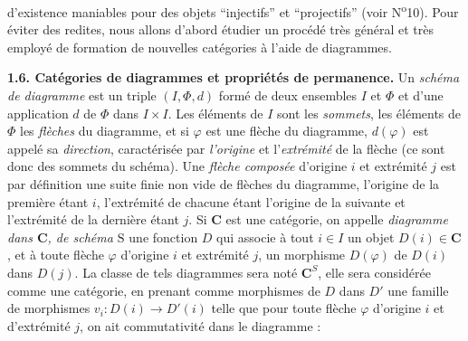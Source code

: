 
\noindent d'existence maniables pour des objets ``injectifs'' et
``projectifs'' (voir N\textsuperscript{o}10). Pour éviter des redites, nous
allons d'abord étudier un procédé très général et très employé de formation de
nouvelles catégories à l'aide de diagrammes.

\noindent\textbf{1.6. Catégories de diagrammes et propriétés de permanence.}
Un \textit{schéma de diagramme} est un triple $(I,\Phi,d)$ formé de deux
ensembles $I$ et $\Phi$ et d'une application $d$ de $\Phi$ dans $I\times I$.
Les éléments de $I$ sont les \textit{sommets}, les éléments de $\Phi$ les
\textit{flèches} du diagramme, et si $\varphi$ est une flèche du diagramme,
$d(\varphi)$ est appelé sa \textit{direction}, caractérisée par
\textit{l'origine} et l'\textit{extrémité} de la flèche (ce sont donc des
sommets du schéma).
Une \textit{flèche composée} d'origine $i$ et extrémité $j$ est par définition
une suite finie non vide de flèches du diagramme, l'origine de la première
étant $i$, l'extrémité de chacune étant l'origine de la suivante et
l'extrémité de la dernière étant $j$.
Si $\mathbf{C}$ est une catégorie, on appelle \textit{diagramme dans $\mathbf{C}$, de schéma
$\mathrm{S}$} une fonction $D$ qui associe à tout $i\in I$ un objet $D(i)\in \mathbf{C}$, et à
toute flèche $\varphi$ d'origine $i$ et extrémité $j$, un morphisme
$D(\varphi)$ de $D(i)$ dans $D(j)$. La classe de tels diagrammes sera noté
$\mathbf{C}^S$, elle sera considérée comme une catégorie, en prenant comme morphismes
de $D$ dans $D'$ une famille de morphismes
$v_i:D(i)\to D'(i)$ telle que pour toute flèche $\varphi$
d'origine $i$ et d'extrémité $j$, on ait commutativité dans le diagramme :

